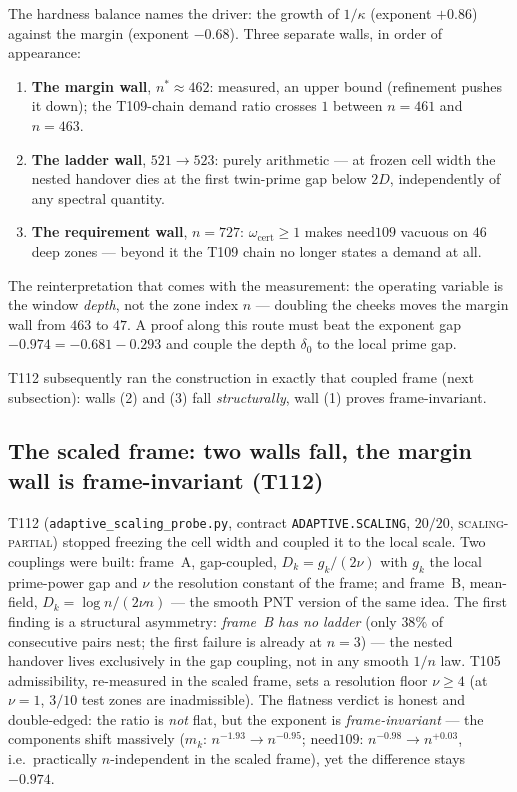 \documentclass[11pt,a4paper]{article}
\begin{document}
\begin{keybox}
The hardness balance names the driver: the growth of $1/\kappa$ (exponent $+0.86$) against the
margin (exponent $-0.68$). Three separate walls, in order of appearance:
\begin{enumerate}[leftmargin=1.6em]
\item \textbf{The margin wall}, $n^*\approx462$: measured, an upper bound (refinement pushes it
down); the T109-chain demand ratio crosses $1$ between $n=461$ and $n=463$.
\item \textbf{The ladder wall}, $521\to523$: purely arithmetic --- at frozen cell width the nested
handover dies at the first twin-prime gap below $2D$, independently of any spectral quantity.
\item \textbf{The requirement wall}, $n=727$: $\omega_{\mathrm{cert}}\ge1$ makes $\mathrm{need109}$
vacuous on $46$ deep zones --- beyond it the T109 chain no longer states a demand at all.
\end{enumerate}
The reinterpretation that comes with the measurement: the operating variable is the window
\emph{depth}, not the zone index $n$ --- doubling the cheeks moves the margin wall from $463$ to
$47$. A proof along this route must beat the exponent gap $-0.974=-0.681-0.293$ and couple the
depth $\delta_0$ to the local prime gap.
\end{keybox}

\noindent T112 subsequently ran the construction in exactly that coupled frame (next subsection):
walls (2) and (3) fall \emph{structurally}, wall (1) proves frame-invariant.

\subsection{The scaled frame: two walls fall, the margin wall is frame-invariant (T112)}
T112 (\texttt{adaptive\_scaling\_probe.py}, contract \texttt{ADAPTIVE.SCALING}, $20/20$,
\textsc{scaling-partial}) stopped freezing the cell width and coupled it to the local scale. Two
couplings were built: frame~A, gap-coupled, $D_k=g_k/(2\nu)$ with $g_k$ the local prime-power gap
and $\nu$ the resolution constant of the frame; and frame~B, mean-field, $D_k=\log n/(2\nu n)$ ---
the smooth PNT version of the same idea. The first finding is a structural asymmetry: \emph{frame~B
has no ladder} (only $38\%$ of consecutive pairs nest; the first failure is already at $n=3$) ---
the nested handover lives exclusively in the gap coupling, not in any smooth $1/n$ law. T105
admissibility, re-measured in the scaled frame, sets a resolution floor $\nu\ge4$ (at $\nu=1$,
$3/10$ test zones are inadmissible). The flatness verdict is honest and double-edged: the ratio is
\emph{not} flat, but the exponent is \emph{frame-invariant} --- the components shift massively
($m_k$: $n^{-1.93}\to n^{-0.95}$; $\mathrm{need109}$: $n^{-0.98}\to n^{+0.03}$, i.e.\ practically
$n$-independent in the scaled frame), yet the difference stays $-0.974$.
\end{document}
